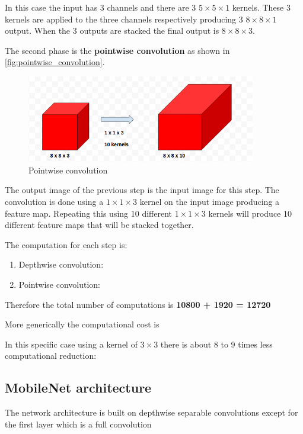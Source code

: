 In this case the input has 3 channels and there are 3 $5\times5\times1$
kernels. These 3 kernels are applied to the three channels respectively
producing 3 $8\times8\times1$ output. When the 3 outputs are stacked the final
output is $8\times8\times3$.

The second phase is the \textbf{pointwise convolution} as shown in
\autoref{fig:pointwise_convolution}.

\begin{figure}[ht]
    \includegraphics[width=10cm]{images/experiments/pointwise_convolution.png}
    \centering
    \caption{Pointwise convolution}\label{fig:pointwise_convolution}
\end{figure}

The output image of the previous step is the input image for this step.
The convolution is done using a $1\times1\times3$ kernel on the input image
producing a feature map. Repeating this using 10 different $1\times1\times3$
kernels will produce 10 different feature maps that will be stacked together.

The computation for each step is:
\begin{enumerate}
    \item Depthwise convolution: 
    \item Pointwise convolution: 
\end{enumerate}

Therefore the total number of computations is \textbf{10800 + 1920 = 12720}

More generically the computational cost is 

In this specific case using a kernel of $3 \times 3$ there is about 8 to 9
times less computational reduction: 

\subsection{MobileNet architecture}
The network architecture is built on depthwise separable convolutions except
for the first layer which is a full convolution

